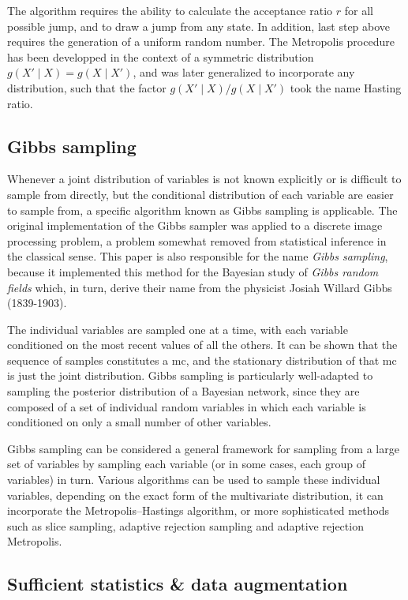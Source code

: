 The algorithm requires the ability to calculate the acceptance ratio $r$ for all possible jump, and to draw a jump from any state. 
In addition, last step above requires the generation of a uniform random number.
The Metropolis procedure has been developped in the context of a symmetric distribution $g(X'\mid X) = g(X \mid X')$, and was later generalized to incorporate any distribution, such that the factor $g(X'\mid X) / g(X \mid X')$ took the name Hasting ratio.

\subsection{Gibbs sampling}

Whenever a joint distribution of variables is not known explicitly or is difficult to sample from directly, but the conditional distribution of each variable are easier to sample from, a specific algorithm known as Gibbs sampling is applicable.
The original implementation of the Gibbs sampler was applied to a discrete image processing problem, a problem somewhat removed from statistical inference in the classical sense.
This paper is also responsible for the name {\it Gibbs sampling}, because it implemented this method for the Bayesian study of {\it Gibbs random fields} which, in turn, derive their name from the physicist Josiah Willard Gibbs (1839-1903).

The individual variables are sampled one at a time, with each variable conditioned on the most recent values of all the others.
It can be shown that the sequence of samples constitutes a \gls{mc}, and the stationary distribution of that \gls{mc} is just the joint distribution.
Gibbs sampling is particularly well-adapted to sampling the \gls{posterior} distribution of a Bayesian network, since they are composed of a set of individual random variables in which each variable is conditioned on only a small number of other variables.

Gibbs sampling can be considered a general framework for sampling from a large set of variables by sampling each variable (or in some cases, each group of variables) in turn.
Various algorithms can be used to sample these individual variables, depending on the exact form of the multivariate distribution, it can incorporate the Metropolis–Hastings algorithm, or more sophisticated methods such as slice sampling, adaptive rejection sampling and adaptive rejection Metropolis.

\subsection{Sufficient statistics \& data augmentation}

